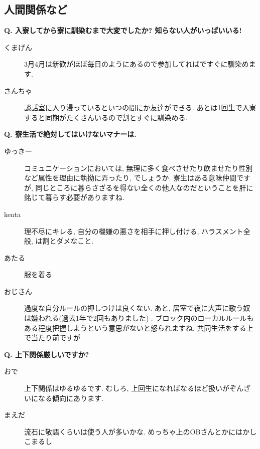 \documentclass[10pt,b5jsbook,dvips,dvipdfmx,openany]{jsbook}
\theoremstyle{definition}
\begin{document}
		\subsection{人間関係など}

		\begin{multicols}{2}

		\begin{tcolorbox}
		\textbf{Q. 入寮してから寮に馴染むまで大変でしたか? 知らない人がいっぱいいる!}
		\end{tcolorbox}

		\begin{description}
		\item[くまげん] 3月4月は新歓がほぼ毎日のようにあるので参加してればですぐに馴染めます. 

		\item[さんちゃ] 談話室に入り浸っているといつの間にか友達ができる. あとは1回生で入寮すると同期がたくさんいるので割とすぐに馴染める. 
		\end{description}
		\begin{tcolorbox}
		\textbf{Q. 寮生活で絶対してはいけないマナーは. }
		\end{tcolorbox}

		\begin{description}
		\item[ゆっきー]
		コミュニケーションにおいては, 無理に多く食べさせたり飲ませたり性別など属性を理由に執拗に弄ったり, でしょうか. 寮生はある意味仲間ですが, 同じところに暮らさざるを得ない全くの他人なのだということを肝に銘じて暮らす必要がありますね. 
		\item[kenta]
		理不尽にキレる, 自分の機嫌の悪さを相手に押し付ける, ハラスメント全般, は割とダメなこと. 
		\item[あたる]
		服を着る
		\item[おじさん]
		過度な自分ルールの押しつけは良くない. あと, 居室で夜に大声に歌う奴は嫌われる(過去1年で2回もありました) . ブロック内のローカルルールもある程度把握しようという意思がないと怒られますね. 共同生活をする上で当たり前ですが
		\end{description}
 
		\begin{tcolorbox}
		\textbf{Q. 上下関係厳しいですか?}
		\end{tcolorbox}
		\begin{description}
		\item[おで] 上下関係はゆるゆるです. むしろ, 上回生になればなるほど扱いがぞんざいになる傾向にあります. 
		\item[まえだ] 流石に敬語くらいは使う人が多いかな. めっちゃ上のOBさんとかにはかしこまるし
		\end{description}

		\end{multicols}
\end{document}
